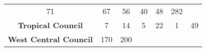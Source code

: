 \documentclass[]{article}
\begin{document}
\begin{longtable}[]{@{}ccccccc@{}}
\begin{minipage}[t]{0.13\columnwidth}
71\strut
\end{minipage} & \begin{minipage}[t]{0.14\columnwidth}\centering\strut
67\strut
\end{minipage} & \begin{minipage}[t]{0.14\columnwidth}\centering\strut
56\strut
\end{minipage} & \begin{minipage}[t]{0.05\columnwidth}\centering\strut
40\strut
\end{minipage} & \begin{minipage}[t]{0.05\columnwidth}\centering\strut
48\strut
\end{minipage} & \begin{minipage}[t]{0.05\columnwidth}\centering\strut
282\strut
\end{minipage}\tabularnewline
\begin{minipage}[t]{0.26\columnwidth}\centering\strut
\textbf{Tropical Council}\strut
\end{minipage} & \begin{minipage}[t]{0.13\columnwidth}\centering\strut
7\strut
\end{minipage} & \begin{minipage}[t]{0.14\columnwidth}\centering\strut
14\strut
\end{minipage} & \begin{minipage}[t]{0.14\columnwidth}\centering\strut
5\strut
\end{minipage} & \begin{minipage}[t]{0.05\columnwidth}\centering\strut
22\strut
\end{minipage} & \begin{minipage}[t]{0.05\columnwidth}\centering\strut
1\strut
\end{minipage} & \begin{minipage}[t]{0.05\columnwidth}\centering\strut
49\strut
\end{minipage}\tabularnewline
\begin{minipage}[t]{0.26\columnwidth}\centering\strut
\textbf{West Central Council}\strut
\end{minipage} & \begin{minipage}[t]{0.13\columnwidth}\centering\strut
170\strut
\end{minipage} & \begin{minipage}[t]{0.14\columnwidth}\centering\strut
200\strut
\end{minipage} & \begin{minipage}[t]{0.14\columnwidth}\centering\strut

\end{minipage}
\end{longtable}
\end{document}
